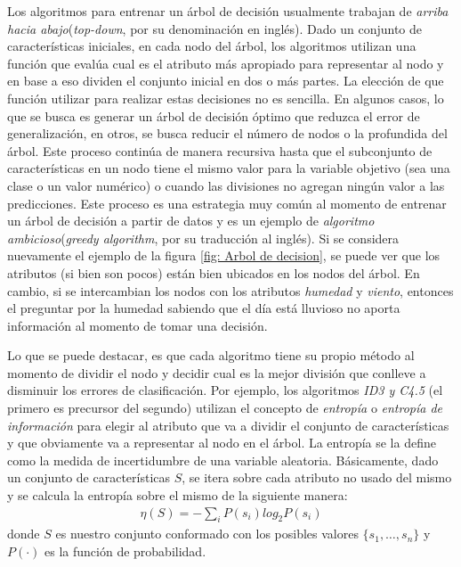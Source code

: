 	Los algoritmos para entrenar un árbol de decisión usualmente trabajan de \textit{arriba hacia abajo}(\textit{top-down}, por su denominación en inglés). Dado un conjunto de características iniciales, en cada nodo del árbol, los algoritmos utilizan una función que evalúa cual es el atributo más apropiado para representar al nodo y en base a eso dividen el conjunto inicial en dos o más partes. La elección de que función utilizar para realizar estas decisiones no es sencilla. En algunos casos, lo que se busca es generar un árbol de decisión óptimo que reduzca el error de generalización, en otros, se busca reducir el número de nodos o la profundida del árbol. Este proceso continúa de manera recursiva hasta que el subconjunto de características en un nodo tiene el mismo valor para la variable objetivo (sea una clase o un valor numérico) o cuando las divisiones no agregan ningún valor a las predicciones. Este proceso es una estrategia muy común al momento de entrenar un árbol de decisión a partir de datos y es un ejemplo de \textit{algoritmo ambicioso}(\textit{greedy algorithm}, por su traducción al inglés). Si se considera nuevamente el ejemplo de la figura \ref{fig: Arbol de decision}, se puede ver que los atributos (si bien son pocos) están bien ubicados en los nodos del árbol. En cambio, si se intercambian los nodos con los atributos \textit{humedad} y \textit{viento}, entonces el preguntar por la humedad sabiendo que el día está lluvioso no aporta información al momento de tomar una decisión.
	
	Lo que se puede destacar, es que cada algoritmo tiene su propio método al momento de dividir el nodo y decidir cual es la mejor división que conlleve a disminuir los errores de clasificación. Por ejemplo, los algoritmos \textit{ID3 y C4.5} \cite{QuinlanID3, QuinlanC45} (el primero es precursor del segundo)  utilizan el concepto de \textit{entropía} o \textit{entropía de información} para elegir al atributo que va a dividir el conjunto de características y que obviamente va a representar al nodo en el árbol. La entropía se la define como la medida de incertidumbre de una variable aleatoria.  Básicamente, dado un conjunto de características $S$, se itera sobre cada atributo no usado del mismo y se calcula la entropía sobre el mismo de la siguiente manera:
	\begin{align}
		\eta(S) = -\sum_i P(s_i)log_{2}P(s_i)
	\end{align}
	donde $S$ es nuestro conjunto conformado con los posibles valores $\{ s_1,\dots, s_n \}$ y $P( \cdot )$ es la función de probabilidad.
	
